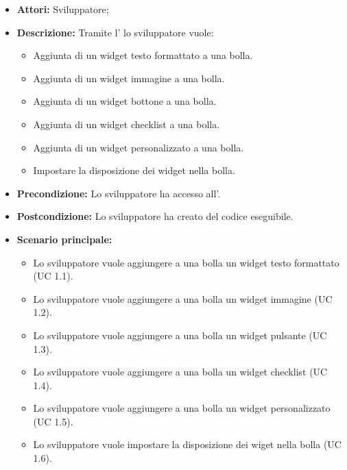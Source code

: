\FloatBarrier
\begin{itemize}
\item \textbf{Attori:} Sviluppatore;
\item \textbf{Descrizione:} Tramite l' lo sviluppatore vuole:
	\begin{itemize}
	\item{Aggiunta di un widget testo formattato a una bolla.} 
	\item{Aggiunta di un widget immagine a una bolla.}
	\item{Aggiunta di un widget bottone a una bolla.}
	\item{Aggiunta di un widget checklist a una bolla.}
	\item{Aggiunta di un widget personalizzato a una bolla.}
	\item{Impostare la disposizione dei widget nella bolla.}
	\end{itemize} 
\item \textbf{Precondizione:} Lo sviluppatore ha accesso all'.
\item \textbf{Postcondizione:} Lo sviluppatore ha creato del codice eseguibile. 
\item \textbf{Scenario principale:}
	\begin{itemize}
	\item{Lo sviluppatore vuole aggiungere a una bolla un widget testo formattato (UC 1.1).}
	\item{Lo sviluppatore vuole aggiungere a una bolla un widget immagine (UC 1.2).}
	\item{Lo sviluppatore vuole aggiungere a una bolla un widget pulsante (UC 1.3).}
	\item{Lo sviluppatore vuole aggiungere a una bolla un widget checklist (UC 1.4).}
	\item{Lo sviluppatore vuole aggiungere a una bolla un widget personalizzato (UC 1.5).}
	\item{Lo sviluppatore vuole impostare la disposizione dei wiget nella bolla (UC 1.6).}
	\end{itemize}
\end{itemize}